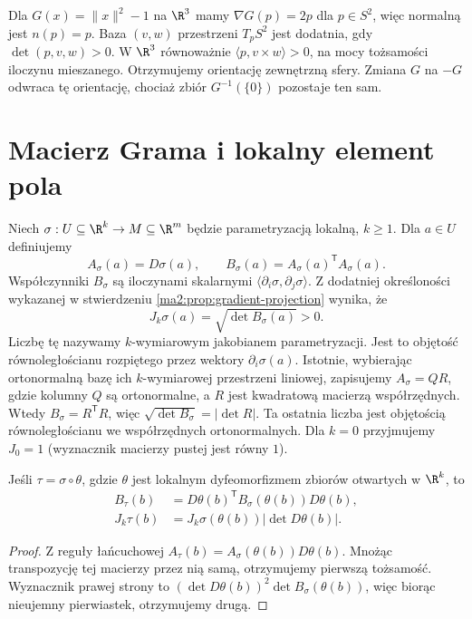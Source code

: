 \begin{przyklad}
\label{ma2:ex:sphere-orientation}
Dla $G(x)=\|x\|^2-1$ na $\R^3$ mamy
$\nabla G(p)=2p$ dla $p\in S^2$, więc normalną
jest $n(p)=p$. Baza $(v,w)$ przestrzeni $T_pS^2$
jest dodatnia, gdy $\det(p,v,w)>0$.
W $\R^3$ równoważnie $\langle p,v\times w\rangle>0$,
na mocy tożsamości iloczynu mieszanego.
Otrzymujemy orientację zewnętrzną sfery.
Zmiana $G$ na $-G$ odwraca tę orientację, chociaż
zbiór $G^{-1}(\{0\})$ pozostaje ten sam.
\end{przyklad}

\section{Macierz Grama i lokalny element pola}

Niech $\sigma:U\subseteq\R^k\to M\subseteq\R^m$
będzie parametryzacją lokalną, $k\ge1$. Dla $a\in U$
definiujemy
\[
 A_\sigma(a)=D\sigma(a),\qquad
 B_\sigma(a)=A_\sigma(a)^{\mathsf T}A_\sigma(a).
\]
Współczynniki $B_\sigma$ są iloczynami skalarnymi
$\langle\partial_i\sigma,\partial_j\sigma\rangle$.
Z dodatniej określoności wykazanej w stwierdzeniu
\ref{ma2:prop:gradient-projection} wynika, że
\[
 J_k\sigma(a)=\sqrt{\det B_\sigma(a)}>0.
\]
Liczbę tę nazywamy $k$-wymiarowym jakobianem
parametryzacji. Jest to objętość równoległościanu
rozpiętego przez wektory $\partial_i\sigma(a)$.
Istotnie, wybierając ortonormalną bazę ich
$k$-wymiarowej przestrzeni liniowej, zapisujemy
$A_\sigma=QR$, gdzie kolumny $Q$ są ortonormalne,
a $R$ jest kwadratową macierzą współrzędnych.
Wtedy $B_\sigma=R^{\mathsf T}R$, więc
$\sqrt{\det B_\sigma}=|\det R|$. Ta ostatnia liczba
jest objętością równoległościanu we współrzędnych
ortonormalnych. Dla $k=0$ przyjmujemy $J_0=1$
(wyznacznik macierzy pustej jest równy $1$).

\begin{stwierdzenie}
\label{ma2:prop:gram-change}
Jeśli $\tau=\sigma\circ\theta$, gdzie $\theta$ jest
lokalnym dyfeomorfizmem zbiorów otwartych w $\R^k$,
to
\[
 \begin{aligned}
 B_\tau(b)&=D\theta(b)^{\mathsf T}
             B_\sigma(\theta(b))D\theta(b),\\
 J_k\tau(b)&=J_k\sigma(\theta(b))|\det D\theta(b)|.
 \end{aligned}
\]
\end{stwierdzenie}
\begin{proof}
Z reguły łańcuchowej
$A_\tau(b)=A_\sigma(\theta(b))D\theta(b)$.
Mnożąc transpozycję tej macierzy przez nią samą,
otrzymujemy pierwszą tożsamość. Wyznacznik prawej
strony to
$(\det D\theta(b))^2\det B_\sigma(\theta(b))$,
więc biorąc nieujemny pierwiastek, otrzymujemy drugą.
\end{proof}

